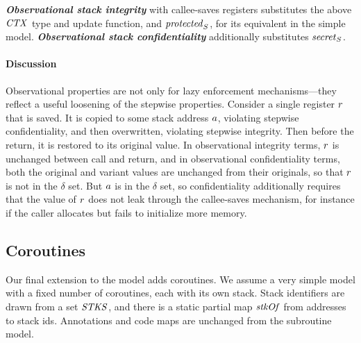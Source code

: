 \documentclass[acmsmall,review,anonymous]{acmart}\settopmatter{printfolios=true,printccs=false,printacmref=false}
\begin{document}
{
%
\textbf{\em Observational stack integrity} with callee-saves registers substitutes the above
\(\mathit{CTX}\) type and update function, and \(\mathit{protected}_S\), for its equivalent in the simple model.
%
\textbf{\em Observational stack confidentiality} additionally substitutes \(\mathit{secret}_S\).

\paragraph{Discussion}

Observational properties are not only for lazy enforcement mechanisms---they reflect a useful
loosening of the stepwise properties. Consider a single register \(r\) that is saved.
It is copied to some stack address \(a\), violating stepwise confidentiality, and then
overwritten, violating stepwise integrity. Then before the return, it is restored to its
original value. In observational integrity terms, \(r\) is unchanged between call and return,
and in observational confidentiality terms, both the original and variant values are unchanged
from their originals, so that \(r\) is not in the \(\delta\) set.  But \(a\) is in the
\(\delta\) set, so confidentiality additionally requires that the value of \(r\) does not
leak through the callee-saves mechanism, for instance if the caller allocates but fails to
initialize more memory.

\subsection{Coroutines}
\label{sec:coroutines}

Our final extension to the model adds coroutines. We assume a very simple model with
a fixed number of coroutines, each with its own stack.
Stack identifiers are drawn from a set \(\mathit{STKS}\), and there is a static partial map
\(\mathit{stkOf}\) from addresses to stack ids.  Annotations and code maps are unchanged from
the subroutine model.

}
\end{document}

